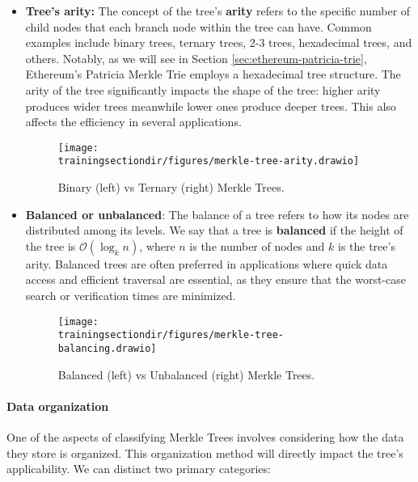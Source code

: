 \begin{itemize}

\item \textbf{Tree's arity:} The concept of the tree's \textbf{arity} refers to the specific number of child nodes that each branch node within the tree can have. Common examples include binary trees, ternary trees, 2-3 trees, hexadecimal trees, and others. Notably, as we will see in Section \ref{sec:ethereum-patricia-trie}, Ethereum's Patricia Merkle Trie employs a hexadecimal tree structure. The arity of the tree significantly impacts the shape of the tree: higher arity produces wider trees meanwhile lower ones produce deeper trees. This also affects the efficiency in several applications.

\begin{figure}[H]
\centering
\texttt{[image: \\trainingsectiondir/figures/merkle-tree-arity.drawio]}
\caption{Binary (left) vs Ternary (right) Merkle Trees.}
\label{fig:merkle-tree-arity}
\end{figure}

\item \textbf{Balanced or unbalanced}: The balance of a tree refers to how its nodes are distributed among its levels. We say that a tree is \textbf{balanced} if the height of the tree is $\mathcal{O}(\log_k n)$, where $n$ is the number of nodes and $k$ is the tree's arity. Balanced trees are often preferred in applications where quick data access and efficient traversal are essential, as they ensure that the worst-case search or verification times are minimized.

\begin{figure}[H]
\centering
\texttt{[image: \\trainingsectiondir/figures/merkle-tree-balancing.drawio]}
\caption{Balanced (left) vs Unbalanced (right) Merkle Trees.}
\label{fig:merkle-tree-balancing}
\end{figure}

\end{itemize}




\paragraph*{Data organization}

One of the aspects of classifying Merkle Trees involves considering how the data they store is organized. This organization method will directly impact the tree's applicability. We can distinct two primary categories:

